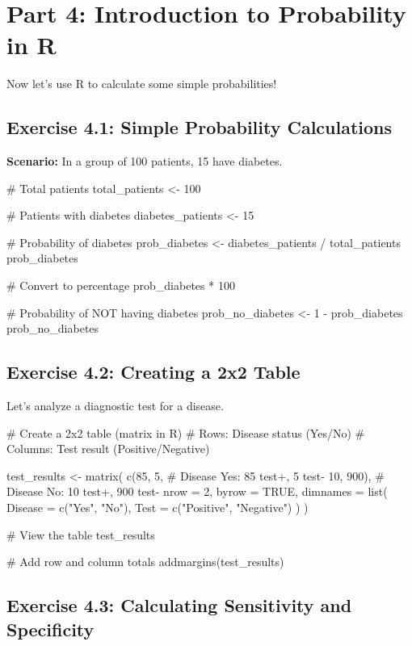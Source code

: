 \documentclass[11pt]{article}
\begin{document}
\section{Part 4: Introduction to Probability in R}

Now let's use R to calculate some simple probabilities!

\subsection{Exercise 4.1: Simple Probability Calculations}

\textbf{Scenario:} In a group of 100 patients, 15 have diabetes.

\begin{rcode}
# Total patients
total_patients <- 100

# Patients with diabetes
diabetes_patients <- 15

# Probability of diabetes
prob_diabetes <- diabetes_patients / total_patients
prob_diabetes

# Convert to percentage
prob_diabetes * 100

# Probability of NOT having diabetes
prob_no_diabetes <- 1 - prob_diabetes
prob_no_diabetes
\end{rcode}

\subsection{Exercise 4.2: Creating a 2x2 Table}

Let's analyze a diagnostic test for a disease.

\begin{rcode}
# Create a 2x2 table (matrix in R)
# Rows: Disease status (Yes/No)
# Columns: Test result (Positive/Negative)

test_results <- matrix(
  c(85, 5,    # Disease Yes: 85 test+, 5 test-
    10, 900), # Disease No: 10 test+, 900 test-
  nrow = 2,
  byrow = TRUE,
  dimnames = list(
    Disease = c("Yes", "No"),
    Test = c("Positive", "Negative")
  )
)

# View the table
test_results

# Add row and column totals
addmargins(test_results)
\end{rcode}

\subsection{Exercise 4.3: Calculating Sensitivity and Specificity}
\end{document}
